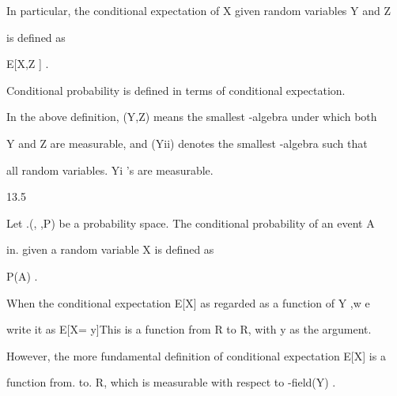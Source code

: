 In particular, the conditional expectation of X given random variables Y and Z

is defined as

E[X\vertY,Z ] .

Conditional probability is defined in terms of conditional expectation.

In the above definition, \sigma(Y,Z) means the smallest \sigma-algebra under which both

Y and Z are measurable, and \sigma({Yi}i\inI ) denotes the smallest \sigma-algebra such that

all random variables. Yi 's are measurable.

\begin{defbox}{13.5}
\end{defbox}

Let .(\Omega, ,P) be a probability space. The conditional probability of an event A

in. given a random variable X is defined as

P(A\vertX) .

When the conditional expectation E[X\vertY] as regarded as a function of Y ,w e

write it as E[X\vertY = y]This is a function from R to R, with y as the argument.

However, the more fundamental definition of conditional expectation E[X\vertY] is a

function from. \Omega to. R, which is measurable with respect to \sigma-field\sigma(Y) .
